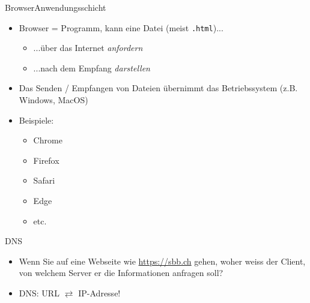 \begin{frame}[fragile]{\faSafari{} Browser}{Anwendungsschicht}
    \begin{itemize}
        \item Browser = Programm, kann eine Datei (meist \texttt{.html})...
              \begin{itemize}
                  \item ...über das Internet \textit{anfordern}
                  \item ...nach dem Empfang \textit{darstellen}
              \end{itemize}
        \item Das Senden / Empfangen von Dateien übernimmt das Betriebssystem (z.B. Windows, MacOS)
        \item Beispiele:
              \begin{itemize}
                  \item \faChrome{} Chrome
                  \item \faFirefox{} Firefox
                  \item \faSafari{} Safari
                  \item \faEdge{} Edge
                  \item  etc.
              \end{itemize}
    \end{itemize}
\end{frame}

\begin{frame}[fragile]{\acrfull{DNS}}
    \begin{itemize}
        \item Wenn Sie auf eine Webseite wie \url{https://sbb.ch} gehen, woher weiss der Client, von welchem Server er die Informationen anfragen soll?
        \item \gls{DNS}: \acrshort{URL} $\rightleftarrows$ \acrshort{IP}-Adresse!
    \end{itemize}
\end{frame}

